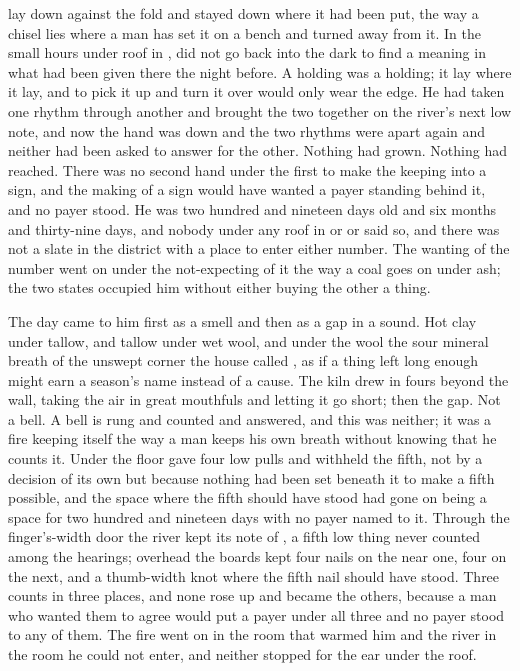 
 lay down against the fold and stayed down where it had been put, the way a chisel lies where a man has set it on a bench and turned away from it. In the small hours under  roof in ,  did not go back into the dark to find a meaning in what had been given there the night before. A holding was a holding; it lay where it lay, and to pick it up and turn it over would only wear the edge. He had taken one rhythm through another and brought the two together on the river's next low note, and now the hand was down and the two rhythms were apart again and neither had been asked to answer for the other. Nothing had grown. Nothing had reached. There was no second hand under the first to make the keeping into a sign, and the making of a sign would have wanted a payer standing behind it, and no payer stood. He was two hundred and nineteen days old and six months and thirty-nine days, and nobody under any roof in  or  or  said so, and there was not a slate in the district with a place to enter either number. The wanting of the number went on under the not-expecting of it the way a coal goes on under ash; the two states occupied him without either buying the other a thing.

The day came to him first as a smell and then as a gap in a sound. Hot clay under tallow, and tallow under wet wool, and under the wool the sour mineral breath of the unswept corner the house called , as if a thing left long enough might earn a season's name instead of a cause. The kiln drew in fours beyond the wall, taking the air in great mouthfuls and letting it go short; then the gap. Not a bell. A bell is rung and counted and answered, and this was neither; it was a fire keeping itself the way a man keeps his own breath without knowing that he counts it. Under the floor  gave four low pulls and withheld the fifth, not by a decision of its own but because nothing had been set beneath it to make a fifth possible, and the space where the fifth should have stood had gone on being a space for two hundred and nineteen days with no payer named to it. Through the finger's-width door the river kept its note of , a fifth low thing never counted among the hearings; overhead the boards kept four nails on the near one, four on the next, and a thumb-width knot where the fifth nail should have stood. Three counts in three places, and none rose up and became the others, because a man who wanted them to agree would put a payer under all three and no payer stood to any of them. The fire went on in the room that warmed him and the river in the room he could not enter, and neither stopped for the ear under the roof.

